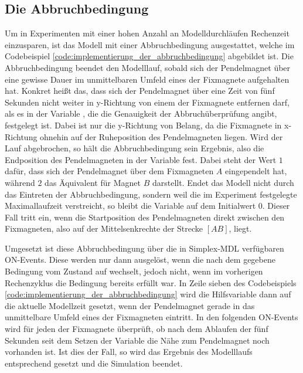\subsection{Die Abbruchbedingung}
\label{ssec:die_abbruchbedingung}

Um in Experimenten mit einer hohen Anzahl an Modelldurchläufen Rechenzeit einzusparen, ist das Modell mit einer Abbruchbedingung ausgestattet, welche im Codebeispiel \ref{code:implementierung_der_abbruchbedingung} abgebildet ist. Die Abbruchbedingung beendet den Modelllauf, sobald sich der Pendelmagnet über eine gewisse Dauer im unmittelbaren Umfeld eines der Fixmagnete aufgehalten hat. Konkret heißt das, dass sich der Pendelmagnet über eine Zeit von fünf Sekunden nicht weiter in y-Richtung von einem der Fixmagnete entfernen darf, als es in der Variable , die die Genauigkeit der Abbruchüberprüfung angibt, festgelegt ist. Dabei ist nur die y-Richtung von Belang, da die Fixmagnete in x-Richtung ohnehin auf der Ruheposition des Pendelmagneten liegen. Wird der Lauf abgebrochen, so hält die Abbruchbedingung sein Ergebnis, also die Endposition des Pendelmagneten in der Variable  fest. Dabei steht der Wert $1$ dafür, dass sich der Pendelmagnet über dem Fixmagneten $A$ eingependelt hat, während $2$ das Äquivalent für Magnet $B$ darstellt. Endet das Modell nicht durch das Eintreten der Abbruchbedingung, sondern weil die im Experiment festgelegte Maximallaufzeit verstreicht, so bleibt die Variable  auf dem Initialwert $0$. Dieser Fall tritt ein, wenn die Startposition des Pendelmagneten direkt zwischen den Fixmagneten, also auf der Mittelsenkrechte der Strecke $[AB]$, liegt.

Umgesetzt ist diese Abbruchbedingung über die in Simplex-MDL verfügbaren ON-Events. Diese werden nur dann ausgelöst, wenn die nach dem  gegebene Bedingung vom Zustand  auf  wechselt, jedoch nicht, wenn im vorherigen Rechenzyklus die Bedingung bereits erfüllt war. In Zeile sieben des Codebeispiels \ref{code:implementierung_der_abbruchbedingung} wird die Hilfsvariable  dann auf die aktuelle Modellzeit  gesetzt, wenn der Pendelmagnet gerade in das unmittelbare Umfeld eines der Fixmagneten eintritt. In den folgenden ON-Events wird für jeden der Fixmagnete überprüft, ob nach dem Ablaufen der fünf Sekunden seit dem Setzen der Variable  die Nähe zum Pendelmagnet noch vorhanden ist. Ist dies der Fall, so wird das Ergebnis des Modelllaufs entsprechend gesetzt und die Simulation beendet.

